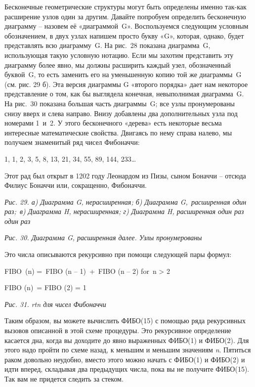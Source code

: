 \documentclass[../main.tex]{subfiles}
\begin{document}
Бесконечные геометрические структуры могут быть определены именно так-как расширение узлов один за другим. Давайте попробуем определить бесконечную диаграмму \--- назовем её «диаграммой~G». Воспользуемся следующим условным обозначением, в двух узлах напишем просто букву «G», которая, однако, будет представлять всю диаграмму~G\@. На рис.~28 показана диаграмма~G, использующая такую условную нотацию. Если мы захотим представить эту диаграмму более явно, мы должны расширить каждый узел, обозначенный буквой~G, то есть заменить его на уменьшенную копию той же диаграммы~G (см. рис. 29 б). Эта версия диаграммы G «второго порядка» дает нам некоторое представление о том, как бы выглядела конечная, невыполнимая диаграмма~G\@. На рис.~30 показана большая часть диаграммы~G; все узлы пронумерованы снизу вверх и слева направо. Внизу добавлены два дополнительных узла под номерами 1~и~2. У этого бесконечного «дерева» есть некоторые весьма интересные математические свойства. Двигаясь по нему справа налево, мы получаем знаменитый ряд чисел Фибоначчи:

1, 1, 2, 3, 5, 8, 13, 21, 34, 55, 89, 144, 233\ldots{}

Этот рад был открыт в 1202 году Леонардом из Пизы, сыном Боначчи \--- отсюда Филиус Боначчи или, сокращенно, Фибоначчи.

\emph{Рис. 29. а) Диаграмма G, нерасширенная; б) Диаграмма G,~расширенная один раз;~в) Диаграмма H, нерасширенная; г) Диаграмма H, расширенная один раз один раз}

\emph{Рис. 30. Диаграмма G, расширенная далее. Узлы пронумерованы}

Это числа описываются рекурсивно при помощи следующей пары формул:

FIBO~(n) =~FIBO (n \--- 1)~+~FIBO (n \--- 2) for~n \textgreater{} 2

FIBO (n)~= FIBO (2) = 1

\emph{Рис. 31. \Acs{rtn} для чисел Фибоначчи}

Таким образом, вы можете вычислить ФИБО(15) с помощью ряда рекурсивных вызовов описанной в этой схеме процедуры. Это рекурсивное определение касается дна, когда вы доходите до явно выраженных ФИБО(1) и ФИБО(2). Для этого надо пройти по схеме назад, к меньшим и меньшим значениям \emph{n}. Пятиться раком довольно неудобно, вместо этого можно начать с ФИБО(1) и ФИБО(2) и идти вперед, складывая два предыдущих числа, пока вы не получите ФИБО(15). Так вам не придется следить за стеком.
\end{document}
